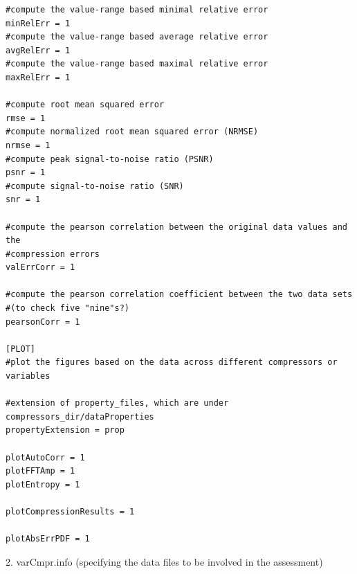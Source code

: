 \begin{lstlisting}[style=ShellStyleInline, basicstyle =\footnotesize\ttfamily]
#compute the value-range based minimal relative error
minRelErr = 1
#compute the value-range based average relative error
avgRelErr = 1
#compute the value-range based maximal relative error
maxRelErr = 1

#compute root mean squared error
rmse = 1
#compute normalized root mean squared error (NRMSE)
nrmse = 1
#compute peak signal-to-noise ratio (PSNR)
psnr = 1
#compute signal-to-noise ratio (SNR)
snr = 1

#compute the pearson correlation between the original data values and the 
#compression errors
valErrCorr = 1

#compute the pearson correlation coefficient between the two data sets 
#(to check five "nine"s?)
pearsonCorr = 1

[PLOT]
#plot the figures based on the data across different compressors or variables

#extension of property_files, which are under compressors_dir/dataProperties
propertyExtension = prop

plotAutoCorr = 1
plotFFTAmp = 1
plotEntropy = 1

plotCompressionResults = 1

plotAbsErrPDF = 1
\end{lstlisting}

2. varCmpr.info (specifying the data files to be involved in the assessment)

